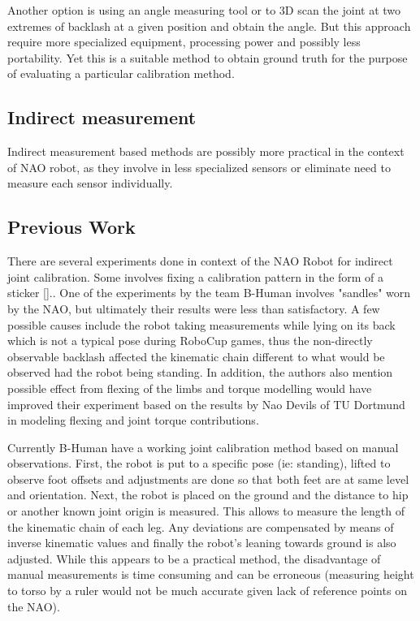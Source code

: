 \documentclass[english, printversion, nomenclature, notitle]{tuvisionthesis} %
\begin{document}
Another option is using an angle measuring tool or to 3D scan the joint at  two extremes of backlash at a given position and obtain the angle. But this approach require more specialized equipment, processing power and possibly less portability. Yet this is a suitable method to obtain ground truth for the purpose of evaluating a particular calibration method. 

\subsection{Indirect measurement}
Indirect measurement based methods are possibly more practical in the context of NAO robot, as they involve in less specialized sensors or eliminate need to measure each sensor individually.
\subsection{Previous Work}

There are several experiments done in context of the NAO Robot for indirect joint calibration. Some involves fixing a calibration pattern in the form of a sticker [].. One of the experiments by the team B-Human involves "sandles" worn by the NAO, but ultimately their results were less than satisfactory. A few possible causes include the robot taking measurements while lying on its back which is not a typical pose during RoboCup games, thus the non-directly observable backlash affected the kinematic chain different to what would be observed had the robot being standing.  In addition, the authors also mention possible effect from flexing of the limbs and torque modelling would have improved their experiment based on the results by Nao Devils of TU Dortmund in modeling flexing and joint torque contributions. 

Currently B-Human have a working joint calibration method based on manual observations. First, the robot is put to a specific pose (ie: standing), lifted to observe foot offsets and adjustments are done so that both feet are at same level and orientation. Next, the robot is placed on the ground and the distance to hip or another known joint origin is measured. This allows to measure the length of the kinematic chain of each leg. Any deviations are compensated by means of inverse kinematic values and finally the robot's leaning  towards ground is also adjusted. While this appears to be a practical method, the disadvantage of manual measurements is time consuming and can be erroneous (measuring height to torso by a ruler would not be much accurate given lack of reference points on the NAO).
\end{document}
